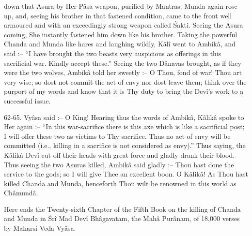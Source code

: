 down that Asura by Her P\^asa weapon, purified by Mantras. Munda again rose up, and, seeing his brother in that fastened condition, came to the front well armoured and with an exceedingly strong weapon called \'Sakti. Seeing the Asura coming, She instantly fastened him down like his brother. Taking the powerful Chanda and Munda like hares and laughing wildly, K\^al\^i went to Ambik\^a, and said :-- ``I have brought the two beasts very auspicious as offerings in this sacrificial war. Kindly accept these.'' Seeing the two D\^anavas brought, as if they were the two wolves, Ambik\^a told her sweetly :-- O Thou, fond of war! Thou art very wise; so dost not commit the act of envy nor dost leave them; think over the purport of my words and know that it is Thy duty to bring the Dev\^i's work to a successful issue.

62-65. Vy\^asa said :-- O King! Hearing thus the words of Ambik\^a, K\^alik\^a spoke to Her again :-- ``In this war-sacrifice there is this axe which is like a sacrificial post; I will offer these two as victims to Thy sacrifice. Thus no act of envy will be committed (i.e., killing in a sacrifice is not considered as envy).'' Thus saying, the K\^alik\^a Dev\^i cut off their heads with great force and gladly drank their blood. Thus seeing the two Asuras killed, Ambik\^a said gladly :-- Thou hast done the service to the gods; so I will give Thee an excellent boon. O K\^alik\^a! As Thou hast killed Chanda and Munda, henceforth Thou wilt be renowned in this world as Ch\^amund\^a.

Here ends the Twenty-sixth Chapter of the Fifth Book on the killing of Chanda and Munda in \'Sr\^i Mad Dev\^i Bh\^agavatam, the Mah\^a Pur\^anam, of 18,000 verses by Maharsi Veda Vy\^asa.